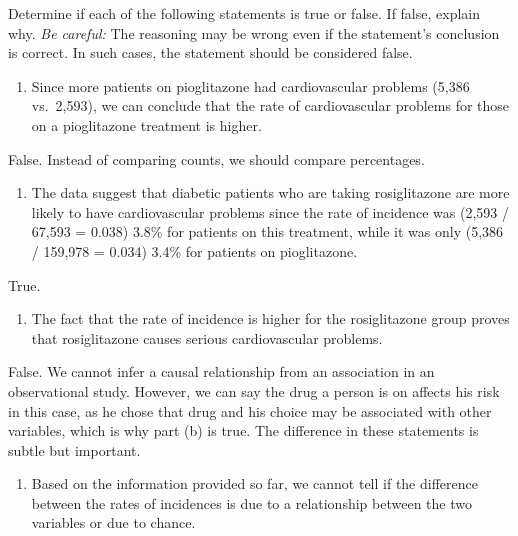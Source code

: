\documentclass[
]{book}
\providecommand{\tightlist}{%
  \setlength{\itemsep}{0pt}\setlength{\parskip}{0pt}}
\begin{document}
Determine if each of the following statements is true or false. If false, explain why. \textit{Be careful:} The reasoning may be wrong even if the statement's conclusion is correct. In such cases, the statement should be considered false.

\begin{enumerate}
\def\labelenumi{\alph{enumi}.}
\tightlist
\item
  Since more patients on pioglitazone had cardiovascular problems (5,386 vs.~2,593), we can conclude that the rate of cardiovascular problems for those on a pioglitazone treatment is higher.
\end{enumerate}

False. Instead of comparing counts, we should compare percentages.

\begin{enumerate}
\def\labelenumi{\alph{enumi}.}
\setcounter{enumi}{1}
\tightlist
\item
  The data suggest that diabetic patients who are taking rosiglitazone are more likely to have cardiovascular problems since the rate of incidence was (2,593 / 67,593 = 0.038) 3.8\% for patients on this treatment, while it was only (5,386 / 159,978 = 0.034) 3.4\% for patients on pioglitazone.
\end{enumerate}

True.

\begin{enumerate}
\def\labelenumi{\alph{enumi}.}
\setcounter{enumi}{2}
\tightlist
\item
  The fact that the rate of incidence is higher for the rosiglitazone group proves that rosiglitazone causes serious cardiovascular problems.
\end{enumerate}

False. We cannot infer a causal relationship from an association in an observational study. However, we can say the drug a person is on affects his risk in this case, as he chose that drug and his choice may be associated with other variables, which is why part (b) is true. The difference in these statements is subtle but important.

\begin{enumerate}
\def\labelenumi{\alph{enumi}.}
\setcounter{enumi}{3}
\tightlist
\item
  Based on the information provided so far, we cannot tell if the difference between the rates of incidences is due to a relationship between the two variables or due to chance.
\end{enumerate}
\end{document}
